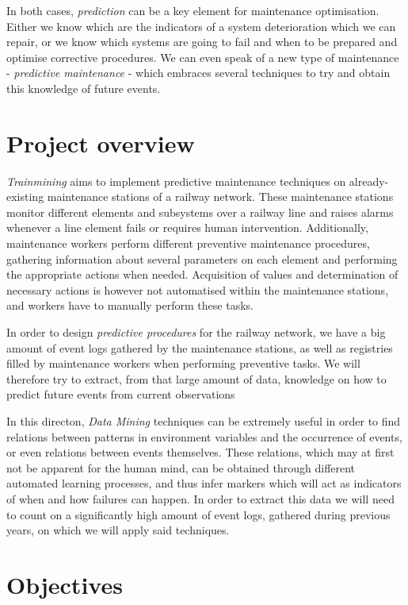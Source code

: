 \documentclass[a4paper,10pt]{report}
\begin{document}
In both cases, \emph{prediction} can be a key element for maintenance optimisation. Either we know which are the indicators of a system deterioration which we can repair, or we know which systems are going to fail and when to be prepared and optimise corrective procedures. We can even speak of a new type of maintenance - \emph{predictive maintenance} - which embraces several techniques to try and obtain this knowledge of future events.

\section{Project overview}
\emph{Trainmining} aims to implement predictive maintenance techniques on already-existing maintenance stations of a railway network. These maintenance stations monitor different elements and subsystems over a railway line and raises alarms whenever a line element fails or requires human intervention. Additionally, maintenance workers perform different preventive maintenance procedures, gathering information about several parameters on each element and performing the appropriate actions when needed. Acquisition of values and determination of necessary actions is however not automatised within the maintenance stations, and workers have to manually perform these tasks.

In order to design \emph{predictive procedures} for the railway network, we have a big amount of event logs gathered by the maintenance stations, as well as registries filled by maintenance workers when performing preventive tasks. We will therefore try to extract, from that large amount of data, knowledge on how to predict future events from current observations

In this directon, \emph{Data Mining} techniques can be extremely useful in order to find relations between patterns in environment variables and the occurrence of events, or even relations between events themselves. These relations, which may at first not be apparent for the human mind, can be obtained through different automated learning processes, and thus infer markers which will act as indicators of when and how failures can happen. In order to extract this data we will need to count on a significantly high amount of event logs, gathered during previous years, on which we will apply said techniques.

\section{Objectives}
\end{document}
